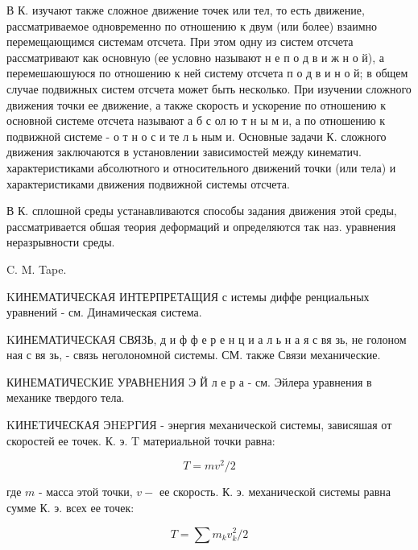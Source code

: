 \documentclass[10pt]{article}
\begin{document}
В К. изучают также сложное движение точек или тел, то есть движение, рассматриваемое одновременно по отношению к двум (или более) взаимно перемещающимся системам отсчета. При этом одну из систем отсчета рассматривают как основную (ее условно называют н е п о д в и ж н о й), а перемешаюшуюся по отношению к ней систему отсчета п о д в и н о й; в общем случае подвижных систем отсчета может быть несколько. При изучении сложного движения точки ее движение, а также скорость и ускорение по отношению к основной системе отсчета называют а б с ол ю т н ы м и, а по отношению к подвижной системе - о т н о с и те л ь ным и. Основные задачи К. сложного движения заключаются в установлении зависимостей между кинематич. характеристиками абсолютного и относительного движений точки (или тела) и характеристиками движения подвижной системы отсчета.



В К. сплошной среды устанавливаются способы задания движения этой среды, рассматривается обшая теория деформаций и определяются так наз. уравнения неразрывности среды.



C. M. Tape.



KИНЕМАТИЧЕСКАЯ ИНТЕРПРЕТАЩИЯ с истемы диффе ренциальных уравнений - см. Динамическая система.



KИНЕМАТИЧЕСКАЯ СВЯЗЬ, д и ф ф е р е н ц и а л ь н а я с вя зь, не голоном ная с вя зь, - связь неголономной системы. СМ. также Связи механические.



КИНЕМАТИЧЕСКИЕ УРАВНЕНИЯ Э Й л е р а - см. Эйлера уравнения в механике твердого тела.



KИНЕTИЧЕСКАЯ ЭHEPГИЯ - энергия механической системы, зависяшая от скоростей ее точек. К. э. T материальной точки равна:



\[

T=m v^{2} / 2

\]



где $m$ - масса этой точки, $v-$ ее скорость. К. э. механической системы равна сумме К. э. всех ее точек:



\[

T=\sum m_{k} v_{k}^{2} / 2

\]
\end{document}
